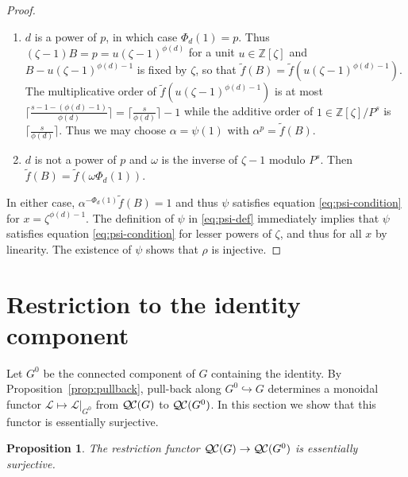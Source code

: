 \documentclass[11pt]{amsart}
\theoremstyle{plain}
\newtheorem{proposition}[theorem]{Proposition}
\theoremstyle{definition}
\theoremstyle{remark}
\newcommand{\ZZ}{{\mathbb{Z}}}
\newcommand{\cs}[1]{{\mathcal{#1}}}
\newcommand{\QC}{{\mathcal{Q\hskip-0.8pt C}}}
\begin{document}
\begin{proof}
  \begin{enumerate}
  \item $d$ is a power of $p$, in which case $\Phi_d(1) = p$.  Thus
    $(\zeta-1)B = p = u(\zeta-1)^{\phi(d)}$ for a unit $u \in \ZZ[\zeta]$
    and $B - u(\zeta-1)^{\phi(d)-1}$ is fixed by $\zeta$,
    so that $\tilde{f}(B) = \tilde{f}(u(\zeta - 1)^{\phi(d)-1})$.  The
    multiplicative order of $\tilde{f}(u(\zeta-1)^{\phi(d)-1})$ is at most
    $\lceil \frac{s - 1 - (\phi(d)-1)}{\phi(d)}\rceil = \lceil \frac{s}{\phi(d)} \rceil - 1$
    while the additive order of $1 \in \ZZ[\zeta]/P^s$ is $\lceil \frac{s}{\phi(d)} \rceil$.
    Thus we may choose $\alpha = \psi(1)$ with $\alpha^p = \tilde{f}(B)$.
  \item $d$ is not a power of $p$ and $\omega$ is the inverse of
    $\zeta-1$ modulo $P^s$.  Then $\tilde{f}(B) = \tilde{f}(\omega\Phi_d(1))$.
  \end{enumerate}
  In either case, $\alpha^{-\Phi_d(1)}\tilde{f}(B) = 1$ and thus
  $\psi$ satisfies equation \ref{eq:psi-condition} for
  $x = \zeta^{\phi(d)-1}$.  The definition of $\psi$ in \ref{eq:psi-def}
  immediately implies that $\psi$ satisfies equation
  \ref{eq:psi-condition} for lesser powers of $\zeta$, and thus for
  all $x$ by linearity.  The existence of $\psi$ shows that $\rho$ is injective.
\end{proof}

\section{Restriction to the identity component}

%

Let $G^0$ be the connected component of $G$ containing the identity.
By Proposition~\ref{prop:pullback}, pull-back along
$G^0\hookrightarrow G$ determines a monoidal functor
$\cs{L}\mapsto \cs{L}\vert_{G^0}$ from $\QC(G)$ to $\QC(G^0)$.  In
this section we show that this functor is essentially surjective. 

\begin{proposition}\label{prop:restriction}
  The restriction functor $\QC(G)\to \QC(G^0)$ is essentially surjective.
\end{proposition}
\end{document}
